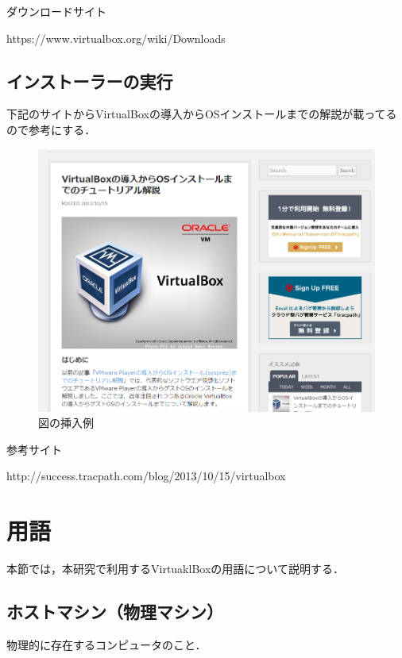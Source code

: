 ダウンロードサイト

https://www.virtualbox.org/wiki/Downloads


\subsection{インストーラーの実行}

下記のサイトからVirtualBoxの導入からOSインストールまでの解説が載ってるので参考にする．

\begin{figure}[H]
\centering
\includegraphics[width=13cm]{sample12.png}
\caption{図の挿入例}\label{サンプル図}
\end{figure}

参考サイト

http://success.tracpath.com/blog/2013/10/15/virtualbox%


\section{用語}

本節では，本研究で利用するVirtuaklBoxの用語について説明する．


\subsection{ホストマシン（物理マシン）}

物理的に存在するコンピュータのこと．

